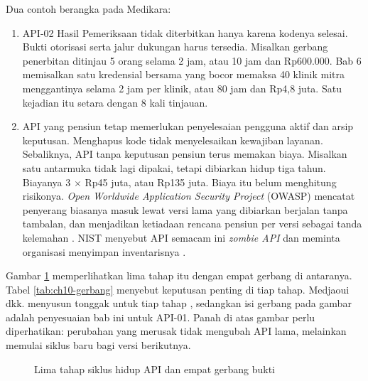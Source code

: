 Dua contoh berangka pada Medikara:
\begin{enumerate}
  \item API-02 Hasil Pemeriksaan tidak diterbitkan hanya karena kodenya selesai. Bukti otorisasi serta jalur dukungan
        harus tersedia. Misalkan gerbang penerbitan ditinjau 5 orang selama 2 jam, atau 10 jam dan Rp600.000. Bab 6
        memisalkan satu kredensial bersama yang bocor memaksa 40 klinik mitra menggantinya selama 2 jam per klinik, atau
        80 jam dan Rp4,8 juta. Satu kejadian itu setara dengan 8 kali tinjauan.
  \item API yang pensiun tetap memerlukan penyelesaian pengguna aktif dan arsip keputusan. Menghapus kode tidak
        menyelesaikan kewajiban layanan. Sebaliknya, API tanpa keputusan pensiun terus memakan biaya. Misalkan satu
        antarmuka tidak lagi dipakai, tetapi dibiarkan hidup tiga tahun. Biayanya 3 $\times$ Rp45 juta, atau Rp135 juta.
        Biaya itu belum menghitung risikonya. \textit{Open Worldwide Application Security Project} (OWASP) mencatat
        penyerang biasanya masuk lewat versi lama yang dibiarkan berjalan tanpa tambalan, dan menjadikan ketiadaan
        rencana pensiun per versi sebagai tanda kelemahan \cite{owasp-api9}. NIST menyebut API semacam ini
        \textit{zombie API} dan meminta organisasi menyimpan inventarisnya \cite{nist-sp800-228}.
\end{enumerate}

Gambar \ref{fig:ch10-siklus} memperlihatkan lima tahap itu dengan empat gerbang di antaranya. Tabel
\ref{tab:ch10-gerbang} menyebut keputusan penting di tiap tahap. Medjaoui dkk. menyusun tonggak untuk tiap tahap
\cite{medjaoui2021continuous}, sedangkan isi gerbang pada gambar adalah penyesuaian bab ini untuk API-01. Panah di atas
gambar perlu diperhatikan: perubahan yang merusak tidak mengubah API lama, melainkan memulai siklus baru bagi versi
berikutnya.

\begin{figure}[!htb]
  \centering
  
  \caption{Lima tahap siklus hidup API dan empat gerbang bukti}
  \label{fig:ch10-siklus}
\end{figure}

